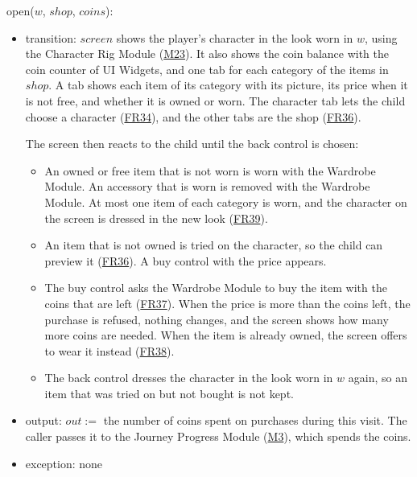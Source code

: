 \documentclass[10pt, titlepage]{article}
\newcommand{\srsurl}{https://team-hindsight.github.io/ophthamology-game/SRS/SRS.pdf}
\newcommand{\srsitemref}[2]{\href{\srsurl\#nameddest=#1}{#2}}
\newcommand{\misref}[2]{\hyperref[mis:#1]{M#2}}
\newcommand{\T}[1]{\mathit{#1}}          %
\newcommand{\out}{\mathit{out}}
\begin{document}
\begin{samepage}
\noindent open($w$, $\T{shop}$, $\T{coins}$):
\begin{itemize}
\item transition: $\T{screen}$ shows the player's character in the look worn
  in $w$, using the Character Rig Module (\misref{Rig}{23}). It also shows the
  coin balance with the coin counter of UI Widgets, and one tab for each
  category of the items in $\T{shop}$. A tab shows each item of its category
  with its picture, its price when it is not free, and whether it is owned or
  worn. The character tab lets the child choose a character
  (\srsitemref{FR_ChooseCharacter}{FR34}), and the other tabs are the shop
  (\srsitemref{FR_Shop}{FR36}).

  The screen then reacts to the child until the back control is chosen:
  \begin{itemize}
  \item An owned or free item that is not worn is worn with the Wardrobe
    Module. An accessory that is worn is removed with the Wardrobe Module. At
    most one item of each category is worn, and the character on the screen is
    dressed in the new look (\srsitemref{FR_Equip}{FR39}).
  \item An item that is not owned is tried on the character, so the child can
    preview it (\srsitemref{FR_Shop}{FR36}). A buy control with the price
    appears.
  \item The buy control asks the Wardrobe Module to buy the item with the
    coins that are left (\srsitemref{FR_Purchase}{FR37}). When the price is
    more than the coins left, the purchase is refused, nothing changes, and the
    screen shows how many more coins are needed. When the item is already
    owned, the screen offers to wear it instead
    (\srsitemref{FR_PurchaseRefused}{FR38}).
  \item The back control dresses the character in the look worn in $w$ again,
    so an item that was tried on but not bought is not kept.
  \end{itemize}
\item output: $\out :=$ the number of coins spent on purchases during this
  visit. The caller passes it to the Journey Progress Module (\misref{Progress}{3}), which spends
  the coins.
\item exception: none
\end{itemize}
\end{samepage}
\par\pagebreak[0]
\end{document}
